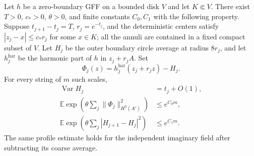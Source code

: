 \begin{lemma}\label{comp:ann-gaussian}
Let $h$ be a zero-boundary GFF on a bounded disk $V$ and let $K\Subset V$.
There exist $T>0$, $c_*>0$, $\theta>0$, and finite constants $C_0,C_1$
with the following property.  Suppose $t_{j+1}-t_j=T$,
$r_j=e^{-t_j}$, and the deterministic centers satisfy
$|z_j-x|\leq c_*r_j$ for some $x\in K$; all the annuli are contained
in a fixed compact subset of $V$.  Let $H_j$ be the outer boundary circle
average at radius $8r_j$, and let $h_j^{\mathrm{har}}$ be the harmonic
part of $h$ in $z_j+r_jA$.  Set
\[
 \Phi_j(z)=h_j^{\mathrm{har}}(z_j+r_jz)-H_j.
\]
For every string of $m$ such scales,
\begin{align}
 \operatorname{Var}H_j&=t_j+O(1),\label{comp:ann-coarse-var}\\
 \mathbb E\exp\!\left(\theta\sum_j
                 \|\Phi_j\|_{H^2(A')}^2\right)&\leq e^{C_0m},
                 \label{comp:ann-profile-moment}\\
 \mathbb E\exp\!\left(\theta\sum_j
                 |H_{j+1}-H_j|^2\right)&\leq e^{C_1m}.
                 \label{comp:ann-increment-moment}
\end{align}
The same profile estimate holds for the independent imaginary field
after subtracting its coarse average.
\end{lemma}

